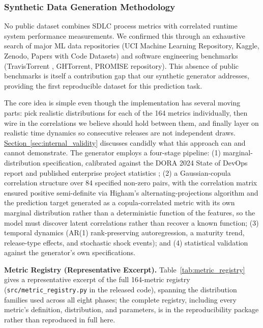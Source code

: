 \documentclass[technologies,article,submit,pdftex,moreauthors]{Definitions/mdpi}
\begin{document}
\subsubsection{Synthetic Data Generation Methodology}\label{sec:synthetic_data}

No public dataset combines SDLC process metrics with correlated runtime system performance measurements. We confirmed this through an exhaustive search of major ML data repositories (UCI Machine Learning Repository, Kaggle, Zenodo, Papers with Code Datasets) and software engineering benchmarks (TravisTorrent \citep{beller2017travistorrent}, GHTorrent, PROMISE repository). This absence of public benchmarks is itself a contribution gap that our synthetic generator addresses, providing the first reproducible dataset for this prediction task.

The core idea is simple even though the implementation has several moving parts: pick realistic distributions for each of the 164 metrics individually, then wire in the correlations we believe should hold between them, and finally layer on realistic time dynamics so consecutive releases are not independent draws. \hyperref[sec:internal_validity]{Section~\ref*{sec:internal_validity}} discusses candidly what this approach can and cannot demonstrate. The generator employs a four-stage pipeline: (1) marginal-distribution specification, calibrated against the DORA 2024 State of DevOps report \citep{dora2024} and published enterprise project statistics \citep{forsgren2018}; (2) a Gaussian-copula correlation structure \citep{nelsen2006} over 84 specified non-zero pairs, with the correlation matrix ensured positive semi-definite via Higham's alternating-projections algorithm \citep{higham2002} and the prediction target generated as a copula-correlated metric with its own marginal distribution rather than a deterministic function of the features, so the model must discover latent correlations rather than recover a known function; (3) temporal dynamics (AR(1) rank-preserving autoregression, a maturity trend, release-type effects, and stochastic shock events); and (4) statistical validation against the generator's own specifications.

\textbf{Metric Registry (Representative Excerpt).} Table~\ref{tab:metric_registry} gives a representative excerpt of the full 164-metric registry (\texttt{src/metric\_registry.py} in the released code), spanning the distribution families used across all eight phases; the complete registry, including every metric's definition, distribution, and parameters, is in the reproducibility package rather than reproduced in full here.
\end{document}

